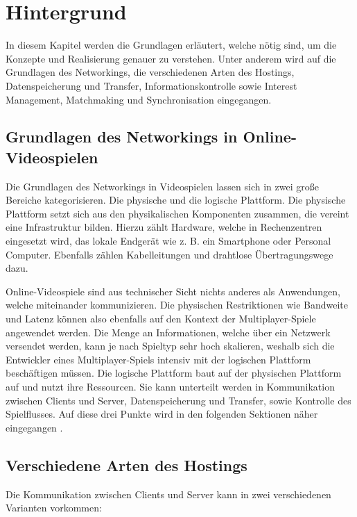 
\chapter{Hintergrund}
\label{sec:hintergrund}

In diesem Kapitel werden die Grundlagen erläutert, welche nötig sind, um die Konzepte und Realisierung genauer zu verstehen. Unter anderem wird auf die Grundlagen des Networkings, die verschiedenen Arten des Hostings, Datenspeicherung und Transfer, Informationskontrolle sowie Interest Management, Matchmaking und Synchronisation eingegangen.

\section{Grundlagen des Networkings in Online-Videospielen}

Die Grundlagen des Networkings in Videospielen lassen sich in zwei große Bereiche kategorisieren. Die physische und die logische Plattform. Die physische Plattform setzt sich aus den physikalischen Komponenten zusammen, die vereint eine Infrastruktur bilden. Hierzu zählt Hardware, welche in Rechenzentren eingesetzt wird, das lokale Endgerät wie z. B. ein Smartphone oder Personal Computer. Ebenfalls zählen Kabelleitungen und drahtlose Übertragungswege dazu. 

Online-Videospiele sind aus technischer Sicht nichts anderes als Anwendungen, welche miteinander kommunizieren. Die physischen Restriktionen wie Bandweite und Latenz können also ebenfalls auf den Kontext der Multiplayer-Spiele angewendet werden. Die Menge an Informationen, welche über ein Netzwerk versendet werden, kann je nach Spieltyp sehr hoch skalieren, weshalb sich die Entwickler eines Multiplayer-Spiels intensiv mit der logischen Plattform beschäftigen müssen. Die logische Plattform baut auf der physischen Plattform auf und nutzt ihre Ressourcen. Sie kann unterteilt werden in Kommunikation zwischen Clients und Server, Datenspeicherung und Transfer, sowie Kontrolle des Spielflusses. Auf diese drei Punkte wird in den folgenden Sektionen näher eingegangen \cite{Smed.2002c}. 

\section{Verschiedene Arten des Hostings}
\label{arten_des_hostings}

Die Kommunikation zwischen Clients und Server kann in zwei verschiedenen Varianten vorkommen:

